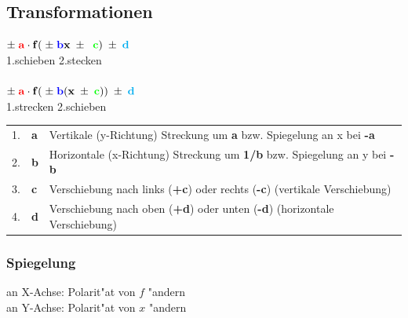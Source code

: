 \begin{flushleft}
		\subsection{Transformationen}
			\begin{minipage}[c]{5cm}
				$\mathbf{\pm \; {\color{red}a} \cdot f( \; \pm \; {\color{blue}b}x \; \pm \; 
				{ \; \color{green}c}) \; \pm \; {\color{cyan}d}}$\\
				 1.schieben 2.stecken\\
				$ $\\
				$\mathbf{\pm \; {\color{red}a} \cdot f( \; \pm \; {\color{blue}b} ( x \; \pm
				{ \; \color{green}c})) \; \pm \; {\color{cyan}d}}$\\
				1.strecken 2.schieben\\	
			\end{minipage}
			\begin{minipage}[t]{10cm}
				\begin{tabular}{lll}
					1. &\textbf{{\color{red}a}} &Vertikale (y-Richtung) Streckung um \textbf{a} bzw. Spiegelung an x bei \textbf{-a}\\
					2. &\textbf{{\color{blue}b}} &Horizontale (x-Richtung) Streckung um \textbf{1/b} bzw. Spiegelung an y bei \textbf{-b}\\
					3. &\textbf{{\color{green}c}} &Verschiebung nach links (\textbf{+c}) oder rechts (\textbf{-c}) (vertikale Verschiebung)\\
					4. &\textbf{{\color{cyan}d}} &Verschiebung nach oben (\textbf{+d}) oder unten (\textbf{-d}) (horizontale Verschiebung)
				\end{tabular}
			\end{minipage}
				
			\subsubsection{Spiegelung}
				an X-Achse: Polarit"at von $f$ "andern\\
				an Y-Achse: Polarit"at von $x$ "andern\\
			

\end{flushleft}
